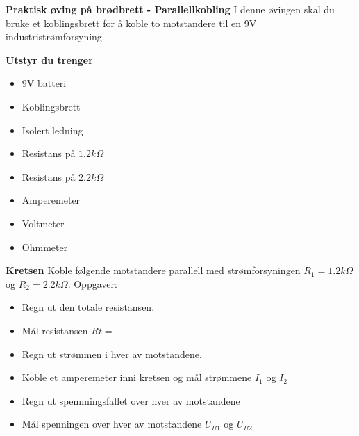 

\large \textbf{Praktisk øving på brødbrett - Parallellkobling }
\normalsize 
\vskip 10pt 
I denne øvingen skal du bruke et koblingsbrett for å koble to motstandere til en 9V industristrømforsyning.

\vskip 10pt 
\large \textbf{Utstyr du trenger}

\vskip 10pt 
\begin{itemize}[noitemsep]

\item 9V batteri
\item Koblingsbrett
\item Isolert ledning
\item Resistans på $1.2k\Omega$
\item Resistans på $2.2k\Omega$
\item Amperemeter
\item Voltmeter
\item Ohmmeter
\end{itemize}


\large \textbf{Kretsen}
\normalsize
\vskip 10pt 
Koble følgende motstandere parallell med strømforsyningen $R_{1}=1.2k\Omega$ og $R_{2}=2.2k\Omega$.
Oppgaver:
\begin{itemize}[noitemsep]
	\item Regn ut den totale resistansen.
	\item Mål resistansen $R{t}=$
	\item Regn ut strømmen i hver av motstandene.
	\item Koble et amperemeter inni kretsen og mål strømmene $I_1$ og $I_2$
	\item Regn ut spemmingsfallet over hver av motstandene
	\item Mål spenningen over hver av motstandene $U_{R1}$ og $U_{R2}$
\end{itemize}




















